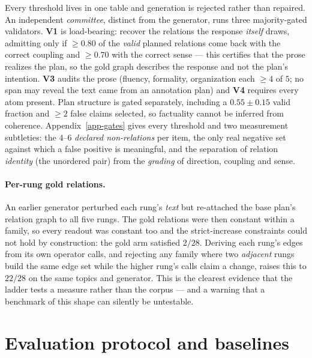 \documentclass{article} %
\begin{document}
Every threshold lives in one table and generation is rejected rather than repaired. An independent
\emph{committee}, distinct from the generator, runs three majority-gated validators. \textbf{V1}
is load-bearing: recover the relations the response \emph{itself} draws, admitting only if
$\ge0.80$ of the \emph{valid} planned relations come back with the correct coupling and $\ge0.70$
with the correct sense --- this certifies that the prose realizes the plan, so the gold graph
describes the response and not the plan's intention. \textbf{V3} audits the prose (fluency,
formality, organization each $\ge4$ of $5$; no span may reveal the text came from an annotation
plan) and \textbf{V4} requires every atom present. Plan structure is gated separately, including a
$0.55\pm0.15$ valid fraction and $\ge2$ false claims selected, so factuality cannot be inferred
from coherence. Appendix~\ref{app-gates} gives every threshold and two measurement subtleties: the
$4$--$6$ \emph{declared non-relations} per item, the only real negative set against which a false
positive is meaningful, and the separation of relation \emph{identity} (the unordered pair) from
the \emph{grading} of direction, coupling and sense.

\paragraph{Per-rung gold relations.} An earlier generator perturbed each rung's \emph{text} but
re-attached the base plan's relation graph to all five rungs. The gold relations were then constant
within a family, so every readout was constant too and the strict-increase constraints could not
hold by construction: the gold arm satisfied $2/28$. Deriving each rung's edges from its own
operator calls, and rejecting any family where two \emph{adjacent} rungs build the same edge set
while the higher rung's calls claim a change, raises this to $22/28$ on the same topics and
generator. This is the clearest evidence that the ladder tests a measure rather than the corpus ---
and a warning that a benchmark of this shape can silently be untestable.

\section{Evaluation protocol and baselines}
\label{sec-baselines}
\end{document}

